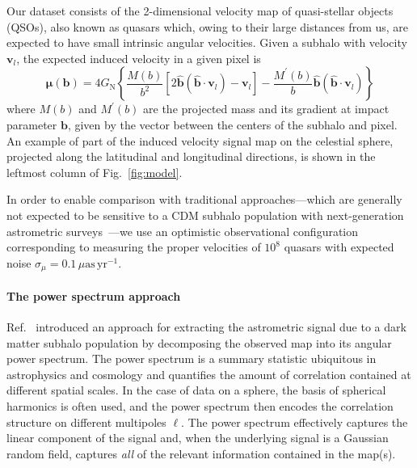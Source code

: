 \documentclass[]{article}
\begin{document}
Our dataset consists of the 2-dimensional velocity map of quasi-stellar objects (QSOs), also known as quasars which, owing to their large distances from us, are expected to have small intrinsic angular velocities. 
Given a subhalo with velocity $\mathbf{v}_{l}$, the expected induced velocity in a given pixel is~\cite{VanTilburg:2018ykj,Mishra-Sharma:2020ynk}
\begin{equation}
    \boldsymbol{\mu}(\mathbf{b})=4 G_{\mathrm{N}}\left\{\frac{M(b)}{b^{2}}\left[2 \hat{\mathbf{b}}\left(\hat{\mathbf{b}} \cdot \mathbf{v}_{l}\right)-\mathbf{v}_{l}\right]-\frac{M^{\prime}(b)}{b} \hat{\mathbf{b}}\left(\hat{\mathbf{b}} \cdot \mathbf{v}_{l}\right)\right\}
\end{equation}
where $M(b)$ and $M^{\prime}(b)$ are the projected mass and its gradient at impact parameter $\mathbf{b}$, given by the vector between the centers of the subhalo and pixel. An example of part of the induced velocity signal map on the celestial sphere, projected along the latitudinal and longitudinal directions, is shown in the leftmost column of Fig.~\ref{fig:model}.

In order to enable comparison with traditional approaches---which are generally not expected to be sensitive to a CDM subhalo population with next-generation astrometric surveys~\cite{VanTilburg:2018ykj,Mishra-Sharma:2020ynk}---we use an optimistic observational configuration corresponding to measuring the proper velocities of $10^8$ quasars with expected noise $\sigma_{\mu} = 0.1\,\mu\mathrm{as}\,\mathrm{yr}^{-1}$.

\paragraph{The power spectrum approach} Ref.~\cite{Mishra-Sharma:2020ynk} introduced an approach for extracting the astrometric signal due to a dark matter subhalo population by decomposing the observed map into its angular power spectrum. The power spectrum is a summary statistic ubiquitous in astrophysics and cosmology and quantifies the amount of correlation contained at different spatial scales. In the case of data on a sphere, the basis of spherical harmonics is often used, and the power spectrum then encodes the correlation structure on different multipoles $\ell$. The power spectrum effectively captures the linear component of the signal and, when the underlying signal is a Gaussian random field, captures \emph{all} of the relevant information contained in the map(s).
\end{document}
